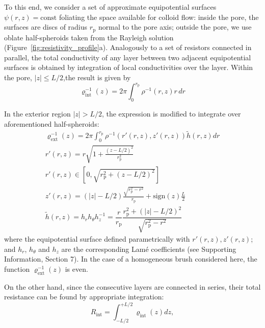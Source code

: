 \documentclass[12pt, a4paper]{article}
\begin{document}

To this end, we consider a set of approximate equipotential surfaces $\psi(r,z)=\text{const}$ foliating the space available for colloid flow: inside the pore, the surfaces are discs of radius $r_{\text{p}}$ normal to the pore axis; outside the pore, we use oblate half-spheroids taken from the Rayleigh solution \cite{Strutt1878} (Figure~\ref{fig:resistivity_profile}a).
Analogously to a set of resistors connected in parallel, the total conductivity of any layer between two adjacent equipotential surfaces is obtained by integration of local conductivities over the layer. Within the pore, $|z|\leq L/2$,the result is given by
\begin{equation}
\varrho_{\text{int}}^{-1}(z)= 2\pi\int_{0}^{r_{\text{p}}^{}} \rho^{-1}(r,z) r \, dr
\label{eq:varrho1}
\end{equation}

In the exterior region $|z| >L/2$, the expression is modified to integrate over aforementioned half-spheroids:
\begin{equation}
    \begin{gathered}
        \varrho_{\text{ext}}^{-1}(z)= 2\pi\int_{0}^{r_{\text{p}}^{}} \rho^{-1}\left( r'(r,z), z'(r,z) \right)  \tilde{h} (r,z) dr\\
        r'(r,z) = r\sqrt{1 + \frac{(z - L/2)^2}{r_{\text{p}}^2}}\\
        r'(r,z) \in [0, \sqrt{r_{\text{p}}^2 + (z-L/2)^2}]\\
        z'(r,z) = (|z| - L/2) \frac{\sqrt{r_{\text{p}}^2 - r^2}}{r_{\text{p}}} +  \text{sign}(z) \frac{L}{2}\\
        \tilde{h} (r,z) = h_r h_{\theta} h_z^{-1} = \dfrac{r}{r_{\text{p}}}\dfrac{r_{\text{p}}^2 + (|z|-L/2)^2}{\sqrt{r_{\text{p}}^2 - r^2}}
    \end{gathered}
\label{eq:varrho2}
\end{equation}
where the equipotential surface defined parametrically with $r'(r,z) , z'(r,z)$; and $h_r$, $h_{\theta}$ and $h_z$ are the corresponding Lam\'e coefficients (see Supporting Information, Section 7). In the case of a homogeneous brush considered here, the function $\varrho_{\text{ext}}^{-1}(z)$ is even.%

On the other hand, since the consecutive layers are connected in series, their total resistance can be found by appropriate integration:
\begin{equation}
    R_{\text{int}} = \int_{-L/2}^{+L/2}\varrho_{\text{int}}(z) dz,
    \label{R_int}
\end{equation}
\end{document}

